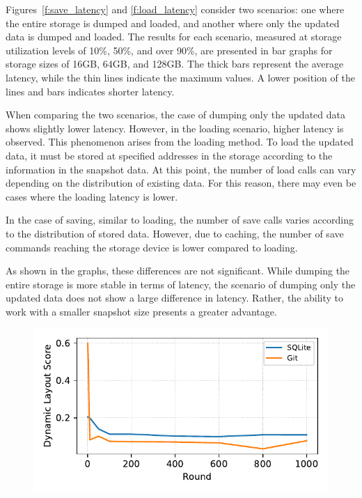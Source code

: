 Figures~\ref{f:save_latency} and \ref{f:load_latency} consider two scenarios: one where the entire storage is dumped and loaded, and another where only the updated data is dumped and loaded.
The results for each scenario, measured at storage utilization levels of 10\%, 50\%, and over 90\%, are presented in bar graphs for storage sizes of 16GB, 64GB, and 128GB.
The thick bars represent the average latency, while the thin lines indicate the maximum values.
A lower position of the lines and bars indicates shorter latency.

When comparing the two scenarios, the case of dumping only the updated data shows slightly lower latency.
However, in the loading scenario, higher latency is observed. This phenomenon arises from the loading method.
To load the updated data, it must be stored at specified addresses in the storage according to the information in the snapshot data.
At this point, the number of load calls can vary depending on the distribution of existing data.
For this reason, there may even be cases where the loading latency is lower.

In the case of saving, similar to loading, the number of save calls varies according to the distribution of stored data.
However, due to caching, the number of save commands reaching the storage device is lower compared to loading.

As shown in the graphs, these differences are not significant.
While dumping the entire storage is more stable in terms of latency, the scenario of dumping only the updated data does not show a large difference in latency.
Rather, the ability to work with a smaller snapshot size presents a greater advantage.


\begin{figure}[t]
    \centering
    \includegraphics[width=0.95\columnwidth]{graphs/py_graph/dynamic}
    \caption{}
    \label{f:dynamic}
\end{figure}

